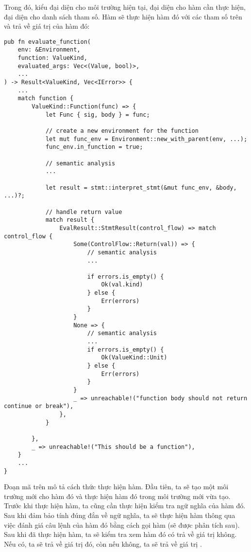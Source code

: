     Trong đó,  kiểu  đại diện cho môi trường hiện tại,  đại diện cho hàm cần thực hiện,  đại diện cho danh sách tham số. Hàm  sẽ thực hiện hàm đó với các tham số trên và trả về giá trị của hàm đó:

\begin{lstlisting}[]
pub fn evaluate_function(
    env: &Environment,
    function: ValueKind,
    evaluated_args: Vec<(Value, bool)>,
    ...
) -> Result<ValueKind, Vec<IError>> {
    ...
    match function {
        ValueKind::Function(func) => {
            let Func { sig, body } = func;

            // create a new environment for the function
            let mut func_env = Environment::new_with_parent(env, ...);
            func_env.in_function = true;

            // semantic analysis
            ...

            let result = stmt::interpret_stmt(&mut func_env, &body, ...)?;

            // handle return value
            match result {
                EvalResult::StmtResult(control_flow) => match control_flow {
                    Some(ControlFlow::Return(val)) => {
                        // semantic analysis
                        ...
                        
                        if errors.is_empty() {
                            Ok(val.kind)
                        } else {
                            Err(errors)
                        }
                    }
                    None => {
                        // semantic analysis
                        ...
                        if errors.is_empty() {
                            Ok(ValueKind::Unit)
                        } else {
                            Err(errors)
                        }
                    }
                    _ => unreachable!("function body should not return continue or break"),
                },
            }

        },
        _ => unreachable!("This should be a function"),
    }
    ...
}
\end{lstlisting}

Đoạn mã trên mô tả cách thức thực hiện hàm. Đầu tiên, ta sẽ tạo một môi trường mới cho hàm đó và thực hiện hàm đó trong môi trường mới vừa tạo. Trước khi thực hiện hàm, ta cũng cần thực hiện kiểm tra ngữ nghĩa của hàm đó. Sau khi đảm bảo tính đúng đắn về ngữ nghĩa, ta sẽ thực hiện hàm thông qua việc đánh giá câu lệnh của hàm đó bằng cách gọi hàm  (sẽ được phân tích sau). Sau khi đã thực hiện hàm, ta sẽ kiểm tra xem hàm đó có trả về giá trị không. Nếu có, ta sẽ trả về giá trị đó, còn nếu không, ta sẽ trả về giá trị . 

